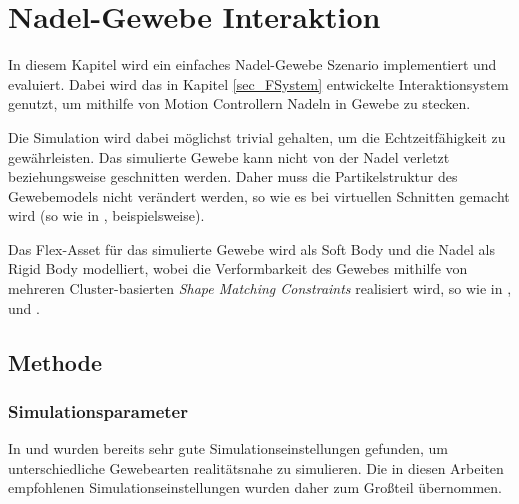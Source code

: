 \section{Nadel-Gewebe Interaktion}%
\label{sec_needle}


In diesem Kapitel wird ein einfaches Nadel-Gewebe Szenario implementiert und evaluiert. Dabei wird das in Kapitel \ref{sec_FSystem} entwickelte Interaktionsystem genutzt, um mithilfe von Motion Controllern Nadeln in Gewebe zu stecken. 

Die Simulation wird dabei möglichst trivial gehalten, um die Echtzeitfähigkeit zu gewährleisten. Das simulierte Gewebe kann nicht von der Nadel verletzt beziehungsweise geschnitten werden. Daher muss die Partikelstruktur des Gewebemodels nicht verändert werden, so wie es bei virtuellen Schnitten gemacht wird (so wie in \cite{PBDCutting}, beispielsweise).

Das Flex-Asset für das simulierte Gewebe wird als Soft Body und die Nadel als Rigid Body modelliert, wobei die Verformbarkeit des Gewebes mithilfe von mehreren Cluster-basierten \textit{Shape Matching Constraints} realisiert wird, so wie in \newline \cite{UPP}, \cite{BreastBiopsy} und \cite{PBDKidney}. 


\subsection{Methode}
\subsubsection{Simulationsparameter}    

In \cite{PBDKidney} und \cite{BreastBiopsy} wurden bereits sehr gute Simulationseinstellungen gefunden, um unterschiedliche Gewebearten realitätsnahe zu simulieren. Die in diesen Arbeiten empfohlenen Simulationseinstellungen wurden daher zum Großteil übernommen.

